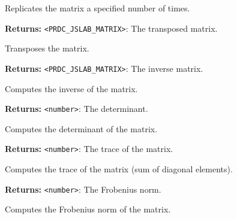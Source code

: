 \documentclass[12pt,a4paper]{article}
\begin{document}
\noindent Replicates the matrix a specified number of times.

\vspace{5mm}
\noindent {}


\noindent \textbf{Returns:} \texttt{<PRDC\_JSLAB\_MATRIX>}: The transposed matrix.

\noindent Transposes the matrix.

\vspace{5mm}
\noindent {}


\noindent \textbf{Returns:} \texttt{<PRDC\_JSLAB\_MATRIX>}: The inverse matrix.

\noindent Computes the inverse of the matrix.

\vspace{5mm}
\noindent {}


\noindent \textbf{Returns:} \texttt{<number>}: The determinant.

\noindent Computes the determinant of the matrix.

\vspace{5mm}
\noindent {}


\noindent \textbf{Returns:} \texttt{<number>}: The trace of the matrix.

\noindent Computes the trace of the matrix (sum of diagonal elements).

\vspace{5mm}
\noindent {}


\noindent \textbf{Returns:} \texttt{<number>}: The Frobenius norm.

\noindent Computes the Frobenius norm of the matrix.

\vspace{5mm}
\noindent {}
\end{document}
